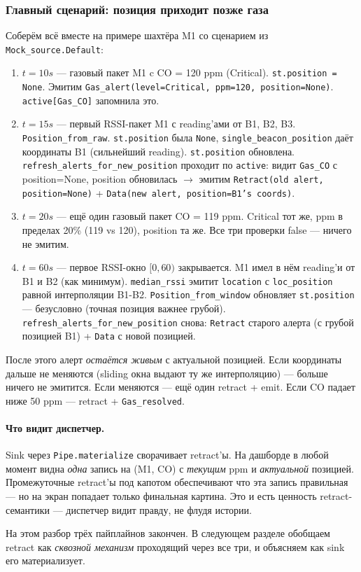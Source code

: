 \subsubsection{Главный сценарий: позиция приходит позже газа}

Соберём всё вместе на примере шахтёра M1 со сценарием из
\texttt{Mock\_source.Default}:

\begin{enumerate}
\item $t = 10s$ --- газовый пакет M1 c CO = 120 ppm (Critical).
\texttt{st.position = None}. Эмитим \texttt{Gas\_alert(level=Critical,
ppm=120, position=None)}. \texttt{active[Gas\_CO]} запомнила это.

\item $t = 15s$ --- первый RSSI-пакет M1 с reading'ами от B1, B2, B3.
\texttt{Position\_from\_raw}. \texttt{st.position} была \texttt{None},
\texttt{single\_beacon\_position} даёт координаты B1
(сильнейший reading). \texttt{st.position} обновлена.
\texttt{refresh\_alerts\_for\_new\_position} проходит по \texttt{active}:
видит \texttt{Gas\_CO} с position=None, position обновилась $\to$
эмитим \texttt{Retract(old alert, position=None)} + \texttt{Data(new
alert, position=B1's coords)}.

\item $t = 20s$ --- ещё один газовый пакет CO = 119 ppm. Critical
тот же, ppm в пределах 20\% (119 vs 120), position та же. Все три
проверки false --- ничего не эмитим.

\item $t = 60s$ --- первое RSSI-окно $[0, 60)$ закрывается. M1
имел в нём reading'и от B1 и B2 (как минимум). \texttt{median\_rssi}
эмитит \texttt{location} с \texttt{loc\_position} равной интерполяции
B1-B2. \texttt{Position\_from\_window} обновляет
\texttt{st.position} --- безусловно (точная позиция важнее грубой).
\texttt{refresh\_alerts\_for\_new\_position} снова: \texttt{Retract}
старого алерта (с грубой позицией B1) + \texttt{Data} с новой
позицией.
\end{enumerate}

После этого алерт \emph{остаётся живым} с актуальной позицией. Если
координаты дальше не меняются (sliding окна выдают ту же интерполяцию)
--- больше ничего не эмитится. Если меняются --- ещё один retract +
emit. Если CO падает ниже 50 ppm --- retract + \texttt{Gas\_resolved}.

\paragraph{Что видит диспетчер.} Sink через \texttt{Pipe.materialize}
сворачивает retract'ы. На дашборде в любой момент видна
\emph{одна} запись на (M1, CO) с \emph{текущим} ppm и
\emph{актуальной} позицией. Промежуточные retract'ы под капотом
обеспечивают что эта запись правильная --- но на экран попадает
только финальная картина. Это и есть ценность retract-семантики ---
диспетчер видит правду, не флудя истории.

\medskip

На этом разбор трёх пайплайнов закончен. В следующем разделе
обобщаем retract как \emph{сквозной механизм} проходящий через все
три, и объясняем как sink его материализует.
